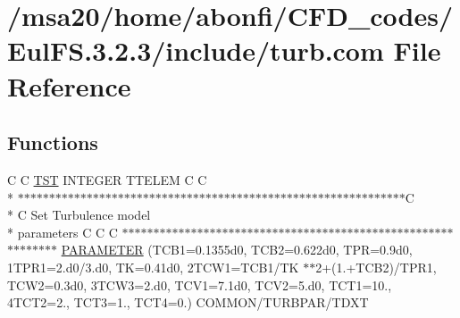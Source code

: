 \hypertarget{msa20_2home_2abonfi_2_c_f_d__codes_2_eul_f_s_83_82_83_2include_2turb_8com}{\section{/msa20/home/abonfi/\-C\-F\-D\-\_\-codes/\-Eul\-F\-S.3.2.3/include/turb.com File Reference}
\label{msa20_2home_2abonfi_2_c_f_d__codes_2_eul_f_s_83_82_83_2include_2turb_8com}
}
\subsection*{Functions}
\begin{DoxyCompactItemize}
\item 
C C \hyperlink{msa20_2home_2abonfi_2_c_f_d__codes_2_eul_f_s_83_82_83_2include_2turb_8com_a677fc6bb107acfd381357f761464b300}{T\-S\-T} I\-N\-T\-E\-G\-E\-R T\-T\-E\-L\-E\-M C C \\*
$\ast$$\ast$$\ast$$\ast$$\ast$$\ast$$\ast$$\ast$$\ast$$\ast$$\ast$$\ast$$\ast$$\ast$$\ast$$\ast$$\ast$$\ast$$\ast$$\ast$$\ast$$\ast$$\ast$$\ast$$\ast$$\ast$$\ast$$\ast$$\ast$$\ast$$\ast$$\ast$$\ast$$\ast$$\ast$$\ast$$\ast$$\ast$$\ast$$\ast$$\ast$$\ast$$\ast$$\ast$$\ast$$\ast$$\ast$$\ast$$\ast$$\ast$$\ast$$\ast$$\ast$$\ast$$\ast$$\ast$$\ast$$\ast$$\ast$$\ast$$\ast$$\ast$C \\*
C Set Turbulence model \\*
parameters C C C $\ast$$\ast$$\ast$$\ast$$\ast$$\ast$$\ast$$\ast$$\ast$$\ast$$\ast$$\ast$$\ast$$\ast$$\ast$$\ast$$\ast$$\ast$$\ast$$\ast$$\ast$$\ast$$\ast$$\ast$$\ast$$\ast$$\ast$$\ast$$\ast$$\ast$$\ast$$\ast$$\ast$$\ast$$\ast$$\ast$$\ast$$\ast$$\ast$$\ast$$\ast$$\ast$$\ast$$\ast$$\ast$$\ast$$\ast$$\ast$$\ast$$\ast$$\ast$$\ast$$\ast$$\ast$$\ast$$\ast$$\ast$$\ast$$\ast$$\ast$$\ast$ \hyperlink{msa20_2home_2abonfi_2_c_f_d__codes_2_eul_f_s_83_82_83_2include_2turb_8com_a389bbfe938bae9bde27ca4e66428f7d1}{P\-A\-R\-A\-M\-E\-T\-E\-R} (T\-C\-B1=0.\-1355d0, T\-C\-B2=0.\-622d0, T\-P\-R=0.\-9d0, 1\-T\-P\-R1=2.\-d0/3.\-d0, T\-K=0.\-41d0, 2\-T\-C\-W1=\-T\-C\-B1/\-T\-K $\ast$$\ast$2+(1.+\-T\-C\-B2)/\-T\-P\-R1, T\-C\-W2=0.\-3d0, 3\-T\-C\-W3=2.\-d0, T\-C\-V1=7.\-1d0, T\-C\-V2=5.\-d0, T\-C\-T1=10., 4\-T\-C\-T2=2., T\-C\-T3=1., T\-C\-T4=0.) C\-O\-M\-M\-O\-N/\-T\-U\-R\-B\-P\-A\-R/\-T\-D\-X\-T
\end{DoxyCompactItemize}
